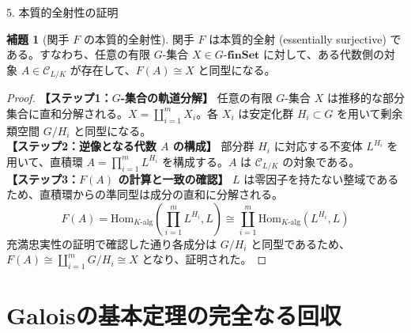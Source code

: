 \documentclass[10pt, unicode]{beamer}
\theoremstyle{definition}
\newtheorem{lem}[thm]{補題}
\begin{document}
\begin{frame}[allowframebreaks]{5. 本質的全射性の証明}
    \begin{lem}[関手 $F$ の本質的全射性]
        関手 $F$ は本質的全射 (essentially surjective) である。すなわち、任意の有限 $G$-集合 $X \in G\text{-}\mathbf{finSet}$ に対して、ある代数側の対象 $A \in \mathcal{C}_{L/K}$ が存在して、$F(A) \cong X$ と同型になる。
    \end{lem}

    \begin{proof}
        \textbf{【ステップ1：$G$-集合の軌道分解】}
        任意の有限 $G$-集合 $X$ は推移的な部分集合に直和分解される。$X = \coprod_{i=1}^m X_i$。各 $X_i$ は安定化群 $H_i \subset G$ を用いて剰余類空間 $G/H_i$ と同型になる。\\
        \textbf{【ステップ2：逆像となる代数 $A$ の構成】}
        部分群 $H_i$ に対応する不変体 $L^{H_i}$ を用いて、直積環 $A = \prod_{i=1}^m L^{H_i}$ を構成する。$A$ は $\mathcal{C}_{L/K}$ の対象である。\\
        \textbf{【ステップ3：$F(A)$ の計算と一致の確認】}
        $L$ は零因子を持たない整域であるため、直積環からの準同型は成分の直和に分解される。
        \[ F(A) = \mathrm{Hom}_{K\text{-alg}}\left(\prod_{i=1}^m L^{H_i}, L\right) \cong \coprod_{i=1}^m \mathrm{Hom}_{K\text{-alg}}(L^{H_i}, L) \]
        充満忠実性の証明で確認した通り各成分は $G/H_i$ と同型であるため、$F(A) \cong \coprod_{i=1}^m G/H_i \cong X$ となり、証明された。
    \end{proof}
\end{frame}

\section{Galoisの基本定理の完全なる回収}
\end{document}
